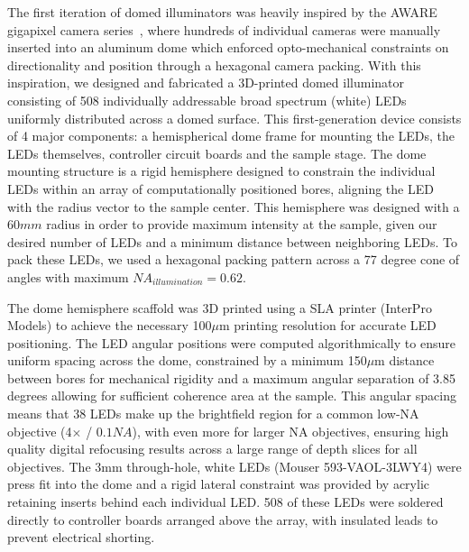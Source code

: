 The first iteration of domed illuminators was heavily inspired by the AWARE gigapixel camera series~\cite{brady2012multiscale, marks2014characterization, llull2015characterization}, where hundreds of individual cameras were manually inserted into an aluminum dome which enforced opto-mechanical constraints on directionality and position through a hexagonal camera packing. With this inspiration, we designed and fabricated a 3D-printed domed illuminator consisting of 508 individually addressable broad spectrum (white) LEDs uniformly distributed across a domed surface. This first-generation device consists of 4 major components: a hemispherical dome frame for mounting the LEDs, the LEDs themselves, controller circuit boards and the sample stage. The dome mounting structure is a rigid hemisphere designed to constrain the individual LEDs within an array of computationally positioned bores, aligning the LED with the radius vector to the sample center. This hemisphere was designed with a $60 mm$ radius in order to provide maximum intensity at the sample, given our desired number of LEDs and a minimum distance between neighboring LEDs. To pack these LEDs, we used a hexagonal packing pattern across a 77 degree cone of angles with maximum $NA_{illumination} = 0.62$.

The dome hemisphere scaffold was 3D printed using a SLA printer (InterPro Models) to achieve the necessary 100$\mu$m printing resolution for accurate LED positioning. The LED angular positions were computed algorithmically to ensure uniform spacing across the dome, constrained by a minimum 150$\mu$m distance between bores for mechanical rigidity and a maximum angular separation of 3.85 degrees allowing for sufficient coherence area at the sample. This angular spacing means that 38 LEDs make up the brightfield region for a common low-NA objective (4$\times$ / $0.1 NA$), with even more for larger NA objectives, ensuring high quality digital refocusing results across a large range of depth slices for all objectives. The $3\textrm{mm}$ through-hole, white LEDs (Mouser 593-VAOL-3LWY4) were press fit into the dome and a rigid lateral constraint was provided by acrylic retaining inserts behind each individual LED. 508 of these LEDs were soldered directly to controller boards arranged above the array, with insulated leads to prevent electrical shorting.

